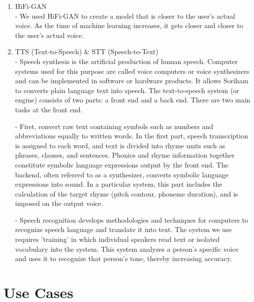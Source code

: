 \documentclass[conference]{IEEEtran}
\begin{document}
\begin{enumerate}
    \item HiFi-GAN\\
    -  We used HiFi-GAN to create a model that is closer to the user’s actual voice. As the time of machine learning increases, it gets closer and closer to the user’s actual voice. 
    \item TTS (Text-to-Speech) \& STT (Speech-to-Text)\\
    - Speech synthesis is the artificial production of human speech. Computer systems used for this purpose are called voice computers or voice synthesizers and can be implemented in software or hardware products. It allows Soriham to converts plain language text into speech. The text-to-speech system (or engine) consists of two parts: a front end and a back end. There are two main tasks at the front end. 
    
    - First, convert raw text containing symbols such as numbers and abbreviations equally to written words. In the first part, speech transcription is assigned to each word, and text is divided into rhyme units such as phrases, clauses, and sentences. Phonics and rhyme information together constitute symbolic language expressions output by the front end. The backend, often referred to as a synthesizer, converts symbolic language expressions into sound. In a particular system, this part includes the calculation of the target rhyme (pitch contour, phoneme duration), and is imposed on the output voice.
    
    - Speech recognition develops methodologies and techniques for computers to recognize speech language and translate it into text. The system we use requires 'training' in which individual speakers read text or isolated vocabulary into the system. This system analyzes a person's specific voice and uses it to recognize that person's tone, thereby increasing accuracy. 
\end{enumerate}

\section{Use Cases}
\end{document}
